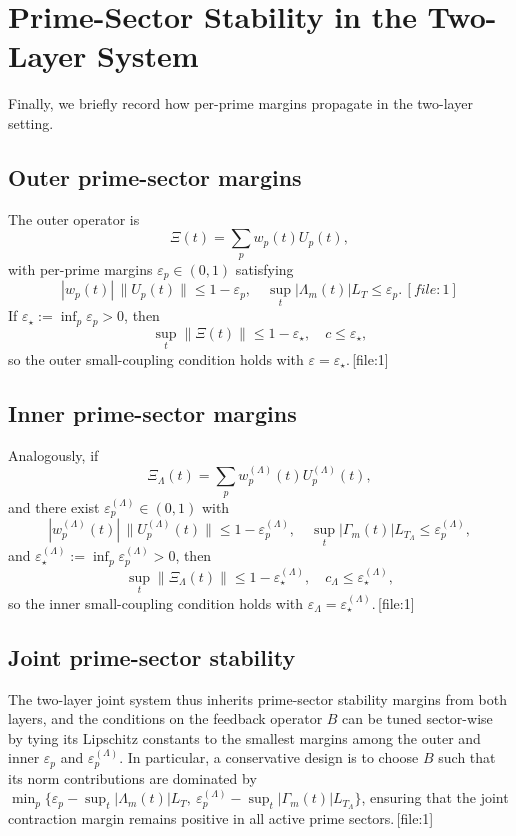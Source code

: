 \documentclass[11pt]{article}
\begin{document}
\section{Prime-Sector Stability in the Two-Layer System}

Finally, we briefly record how per-prime margins propagate in the two-layer setting.

\subsection{Outer prime-sector margins}

The outer operator is
\[
\Xi(t) = \sum_p w_p(t)U_p(t),
\]
with per-prime margins $\varepsilon_p\in(0,1)$ satisfying
\[
|w_p(t)|\,\|U_p(t)\|\le 1-\varepsilon_p,
\quad
\sup_t|\Lambda_m(t)|L_T\le\varepsilon_p.\,[file:1]
\]
If $\varepsilon_\star:=\inf_p\varepsilon_p>0$, then
\[
\sup_t\|\Xi(t)\|\le 1-\varepsilon_\star,
\quad
c\le\varepsilon_\star,
\]
so the outer small-coupling condition holds with $\varepsilon=\varepsilon_\star$.\,[file:1]

\subsection{Inner prime-sector margins}

Analogously, if
\[
\Xi_\Lambda(t) = \sum_p w^{(\Lambda)}_p(t)U^{(\Lambda)}_p(t),
\]
and there exist $\varepsilon^{(\Lambda)}_p\in(0,1)$ with
\[
|w^{(\Lambda)}_p(t)|\,\|U^{(\Lambda)}_p(t)\|
\le 1-\varepsilon^{(\Lambda)}_p,\quad
\sup_t|\Gamma_m(t)|L_{T_\Lambda}\le\varepsilon^{(\Lambda)}_p,
\]
and $\varepsilon_\star^{(\Lambda)}:=\inf_p\varepsilon^{(\Lambda)}_p>0$, then
\[
\sup_t\|\Xi_\Lambda(t)\|\le 1-\varepsilon_\star^{(\Lambda)},
\quad
c_\Lambda\le\varepsilon_\star^{(\Lambda)},
\]
so the inner small-coupling condition holds with $\varepsilon_\Lambda=\varepsilon_\star^{(\Lambda)}$.\,[file:1]

\subsection{Joint prime-sector stability}

The two-layer joint system thus inherits prime-sector stability margins from both layers, and the conditions on the feedback operator $B$ can be tuned sector-wise by tying its Lipschitz constants to the smallest margins among the outer and inner $\varepsilon_p$ and $\varepsilon^{(\Lambda)}_p$. In particular, a conservative design is to choose $B$ such that its norm contributions are dominated by $\min_p\{\varepsilon_p-\sup_t|\Lambda_m(t)|L_T,\ \varepsilon^{(\Lambda)}_p-\sup_t|\Gamma_m(t)|L_{T_\Lambda}\}$, ensuring that the joint contraction margin remains positive in all active prime sectors.\,[file:1]

\nocite{*}
  
  
\end{document}
